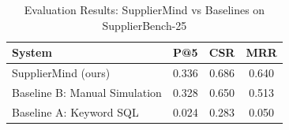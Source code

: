 \begin{table}[h]
\centering
\caption{Evaluation Results: SupplierMind vs Baselines on SupplierBench-25}
\label{tab:results}
\begin{tabular}{lccc}
\hline
\textbf{System} & \textbf{P@5} & \textbf{CSR} & \textbf{MRR} \\
\hline
SupplierMind (ours) & 0.336 & 0.686 & 0.640 \\
Baseline B: Manual Simulation & 0.328 & 0.650 & 0.513 \\
Baseline A: Keyword SQL & 0.024 & 0.283 & 0.050 \\
\hline
\end{tabular}
\end{table}